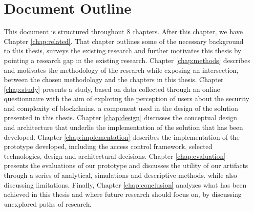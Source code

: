 \section{Document Outline}

This document is structured throughout 8 chapters. After this chapter, we have Chapter \ref{chap:related}. That chapter outlines some of the necessary background to this thesis, surveys the existing research and further motivates this thesis by pointing a research gap in the existing research. Chapter \ref{chap:methods} describes and motivates the methodology of the research while exposing an intersection, between the chosen methodology and the chapters in this thesis. Chapter \ref{chap:study} presents a study, based on data collected through an online questionnaire with the aim of exploring the perception of users about the security and complexity of blockchains, a component used in the design of the solution presented in this thesis. Chapter \ref{chap:design} discusses the conceptual design and architecture that underlie the implementation of the solution that has been developed. Chapter \ref{chap:implementation} describes the implementation of the prototype developed, including the access control framework, selected technologies, design and architectural decisions. Chapter \ref{chap:evaluation} presents the evaluations of our prototype and discusses the utility of our artifacts through a series of analytical, simulations and descriptive methods, while also discussing limitations. Finally, Chapter \ref{chap:conclusion} analyzes what has been achieved in this thesis and where future research should focus on, by discussing unexplored paths of research.
